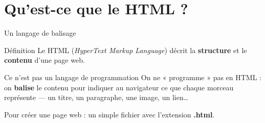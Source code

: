 \documentclass[aspectratio=169,11pt]{beamer}
\begin{document}
\section{Qu'est-ce que le HTML ?}
{
\begin{frame}[plain]
\end{frame}
}

\begin{frame}{Un langage de balisage}
  \begin{block}{Définition}
    Le HTML (\textit{HyperText Markup Language}) décrit la \textbf{structure} et le \textbf{contenu} d'une page web.
  \end{block}
  \vspace{0.3cm}
  \begin{alertblock}{Ce n'est pas un langage de programmation}
    On ne « programme » pas en HTML : on \textbf{balise} le contenu pour indiquer au navigateur ce que chaque morceau représente --- un titre, un paragraphe, une image, un lien\dots
  \end{alertblock}
  \vspace{0.3cm}
  \begin{center}
    \small Pour créer une page web : un simple fichier avec l'extension \textbf{.html}.
  \end{center}
\end{frame}
\end{document}
